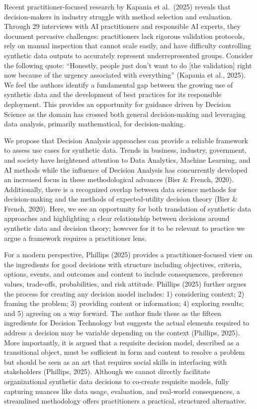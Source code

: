 \documentclass[12pt,a4paper]{article}
\begin{document}
Recent practitioner-focused research by Kapania et al.\ (2025) reveals that decision-makers in industry struggle with method selection and evaluation. Through 29 interviews with AI practitioners and responsible AI experts, they document pervasive challenges: practitioners lack rigorous validation protocols, rely on manual inspection that cannot scale easily, and have difficulty controlling synthetic data outputs to accurately represent underrepresented groups. Consider the following quote: ``Honestly, people just don't want to do [the validation] right now because of the urgency associated with everything'' (Kapania et al., 2025). We feel the authors identify a fundamental gap between the growing use of synthetic data and the development of best practices for its responsible deployment. This provides an opportunity for guidance driven by Decision Science as the domain has crossed both general decision-making and leveraging data analysis, primarily mathematical, for decision-making.

We propose that Decision Analysis approaches can provide a reliable framework to assess use cases for synthetic data. Trends in business, industry, government, and society have heightened attention to Data Analytics, Machine Learning, and AI methods while the influence of Decision Analysis has concurrently developed an increased focus in these methodological advances (Bier \& French, 2020). Additionally, there is a recognized overlap between data science methods for decision-making and the methods of expected-utility decision theory (Bier \& French, 2020). Here, we see an opportunity for both translation of synthetic data approaches and highlighting a clear relationship between decisions around synthetic data and decision theory; however for it to be relevant to practice we argue a framework requires a practitioner lens.

For a modern perspective, Phillips (2025) provides a practitioner-focused view on the ingredients for good decisions with structure including objectives, criteria, options, events, and outcomes and content to include consequences, preference values, trade-offs, probabilities, and risk attitude. Phillips (2025) further argues the process for creating any decision model includes: 1) considering context; 2) framing the problem; 3) providing content or information; 4) exploring results; and 5) agreeing on a way forward. The author finds these as the fifteen ingredients for Decision Technology but suggests the actual elements required to address a decision may be variable depending on the context (Phillips, 2025). More importantly, it is argued that a requisite decision model, described as a transitional object, must be sufficient in form and content to resolve a problem but should be seen as an art that requires social skills in interfacing with stakeholders (Phillips, 2025). Although we cannot directly facilitate organizational synthetic data decisions to co-create requisite models, fully capturing nuances like data usage, evaluation, and real-world consequences, a streamlined methodology offers practitioners a practical, structured alternative.
\end{document}
